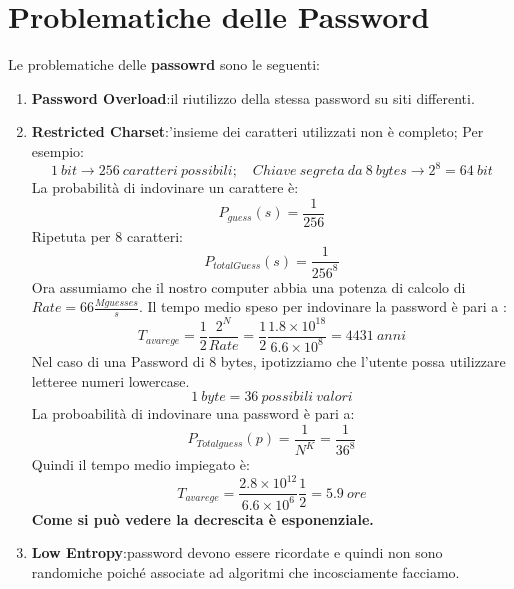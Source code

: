 \documentclass{book}
\theoremstyle{remark}
\begin{document}
\section{Problematiche delle Password}
Le problematiche delle \textbf{passowrd} sono le seguenti:
\begin{enumerate}
	\item \textbf{Password Overload}: il riutilizzo della stessa password su siti differenti\@.
	\item \textbf{Restricted Charset}:\@l'insieme dei caratteri utilizzati non è completo;\@
	      Per esempio:\begin{equation*}
		      1\ bit\rightarrow 256\ caratteri\ possibili;\quad Chiave\ segreta\ da\ 8\ bytes\rightarrow 2^8=64\ bit
	      \end{equation*}
	      La probabilità di indovinare un carattere è:
	      \begin{equation*}
		      P_{guess}(s)=\frac{1}{256}
	      \end{equation*}
	      Ripetuta per 8 caratteri:\begin{equation*}
		      P_{totalGuess}(s)=\frac{1}{256^8}
	      \end{equation*} Ora assumiamo che il nostro computer abbia una potenza di calcolo di \(Rate=66\frac{Mguesses}{s}\)\@. Il tempo medio speso per indovinare la password è pari a :
	      \begin{equation*}
		      T_{avarege}=\frac{1}{2}\frac{2^N}{Rate}=\frac{1}{2}\frac{1.8\times10^{18}}{6.6\times10^{8}}=4431\ anni
	      \end{equation*}
	      Nel caso di una Password di 8 bytes, ipotizziamo che l'utente possa utilizzare letteree  numeri lowercase\@.\begin{equation*}
		      1\ byte= 36\ possibili\ valori
	      \end{equation*}
	      La proboabilità di indovinare una password è pari a:
	      \begin{equation*}
		      P_{Totalguess}(p)=\frac{1}{N^K}=\frac{1}{36^8}
	      \end{equation*}
	      Quindi il tempo medio impiegato è:
	      \begin{equation*}
		      T_{avarege}=\frac{2.8\times10^12}{6.6\times10^6}\frac{1}{2}=5.9\ ore
	      \end{equation*}
	      \textbf{Come si può vedere la decrescita è esponenziale\@.}
	\item \textbf{Low Entropy}:\@Le password devono essere ricordate e quindi non sono randomiche poiché associate ad algoritmi che incosciamente facciamo\@.

\end{enumerate}
\end{document}

